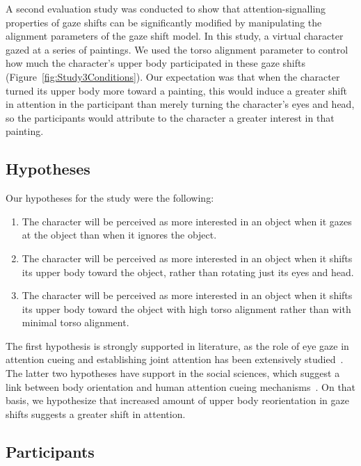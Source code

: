 A second evaluation study was conducted to show that attention-signalling properties of gaze shifts can be significantly modified by manipulating the alignment parameters of the gaze shift model. In this study, a virtual character gazed at a series of paintings. We used the torso alignment parameter to control how much the character's upper body participated in these gaze shifts (Figure~\ref{fig:Study3Conditions}). Our expectation was that when the character turned its upper body more toward a painting, this would induce a greater shift in attention in the participant than merely turning the character's eyes and head, so the participants would attribute to the character a greater interest in that painting.

\subsection{Hypotheses}

Our hypotheses for the study were the following:

\begin{enumerate}
\item The character will be perceived as more interested in an object when it gazes at the object than when it ignores the object.
\item The character will be perceived as more interested in an object when it shifts its upper body toward the object, rather than rotating just its eyes and head.
\item The character will be perceived as more interested in an object when it shifts its upper body toward the object with high torso alignment rather than with minimal torso alignment.
\end{enumerate}

The first hypothesis is strongly supported in literature, as the role of eye gaze in attention cueing and establishing joint attention has been extensively studied~\citep{frischen2007gaze}. The latter two hypotheses have support in the social sciences, which suggest a link between body orientation and human attention cueing mechanisms~\citep{hietanen2002social,pomianowska2011socialcues,kendon1990conducting,schegloff1998bodytorque}. On that basis, we hypothesize that increased amount of upper body reorientation in gaze shifts suggests a greater shift in attention.

\subsection{Participants}

